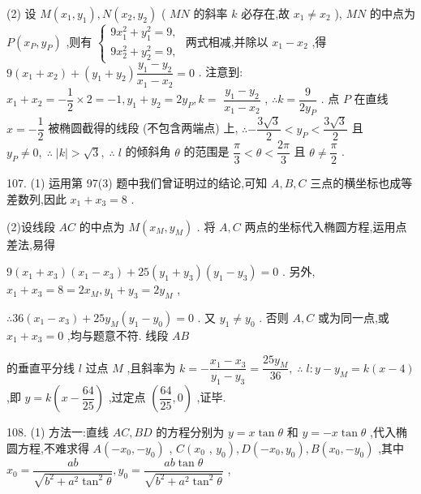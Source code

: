 (2) 设 $M\left( {{x}_{1},{y}_{1}}\right) ,N\left( {{x}_{2},{y}_{2}}\right)$ ( ${MN}$ 的斜率 $k$ 必存在,故 ${x}_{1} \neq  {x}_{2}$ ), ${MN}$ 的中点为 $P\left( {{x}_{P},{y}_{P}}\right)$ ,则有 $\left\{  \begin{array}{l} 9{x}_{1}^{2} + {y}_{1}^{2} = 9, \\  9{x}_{2}^{2} + {y}_{2}^{2} = 9, \end{array}\right.$ 两式相减,并除以 ${x}_{1} - {x}_{2}$ ,得 $9\left( {{x}_{1} + {x}_{2}}\right)  + \left( {{y}_{1} + {y}_{2}}\right) \dfrac{{y}_{1} - {y}_{2}}{{x}_{1} - {x}_{2}} = 0$ . 注意到: ${x}_{1} + {x}_{2} =  - \dfrac{1}{2} \times  2 =  - 1,{y}_{1} + {y}_{2} = 2{y}_{P},k =$  $\dfrac{{y}_{1} - {y}_{2}}{{x}_{1} - {x}_{2}}$ , $\therefore k = \dfrac{9}{2{y}_{P}}$ . 点 $P$ 在直线 $x =  - \dfrac{1}{2}$ 被椭圆截得的线段 (不包含两端点) 上, $\therefore  - \dfrac{3\sqrt{3}}{2} < {y}_{P} < \dfrac{3\sqrt{3}}{2}$ 且 ${y}_{P} \neq  0,\;\therefore \;\left| k\right|  > \sqrt{3},\;\therefore \;l$ 的倾斜角 $\theta$ 的范围是 $\dfrac{\pi }{3} < \theta  < \dfrac{2\pi }{3}$ 且 $\theta  \neq  \dfrac{\pi }{2}$ .

107. (1) 运用第 97(3) 题中我们曾证明过的结论,可知 $A,B,C$ 三点的横坐标也成等差数列,因此 ${x}_{1} + {x}_{3} = 8$ .

(2)设线段 ${AC}$ 的中点为 $M\left( {{x}_{M},{y}_{M}}\right)$ . 将 $A,C$ 两点的坐标代入椭圆方程,运用点差法,易得

$9\left( {{x}_{1} + {x}_{3}}\right) \left( {{x}_{1} - {x}_{3}}\right)  + {25}\left( {{y}_{1} + {y}_{3}}\right) \left( {{y}_{1} - {y}_{3}}\right)  = 0$ . 另外, ${x}_{1} + {x}_{3} = 8 = 2{x}_{M},{y}_{1} + {y}_{3} = 2{y}_{M}$ ,

$\therefore {36}\left( {{x}_{1} - {x}_{3}}\right)  + {25}{y}_{M}\left( {{y}_{1} - {y}_{0}}\right)  = 0$ . 又 ${y}_{1} \neq  {y}_{0}$ . 否则 $A,C$ 或为同一点,或 ${x}_{1} + {x}_{3} = 0$ ,均与题意不符. 线段 ${AB}$

的垂直平分线 $l$ 过点 $M$ ,且斜率为 $k =  - \dfrac{{x}_{1} - {x}_{3}}{{y}_{1} - {y}_{3}} = \dfrac{{25}{y}_{M}}{36},\;\therefore \;l : y - {y}_{M} = k\left( {x - 4}\right)$ ,即 $y = k\left( {x - \dfrac{64}{25}}\right)$ ,过定点 $\left( {\dfrac{64}{25},0}\right)$ ,证毕.

108. (1) 方法一:直线 ${AC},{BD}$ 的方程分别为 $y = x\tan \theta$ 和 $y =  - x\tan \theta$ ,代入椭圆方程,不难求得 $A\left( {-{x}_{0}, - {y}_{0}}\right)$ , $C\left( {x}_{0}\right.$ , $\left. {y}_{0}\right) ,D\left( {-{x}_{0},{y}_{0}}\right) ,B\left( {{x}_{0}, - {y}_{0}}\right)$ ,其中 ${x}_{0} = \dfrac{ab}{\sqrt{{b}^{2} + {a}^{2}{\tan }^{2}\theta }},{y}_{0} = \dfrac{{ab}\tan \theta }{\sqrt{{b}^{2} + {a}^{2}{\tan }^{2}\theta }}$ ,

